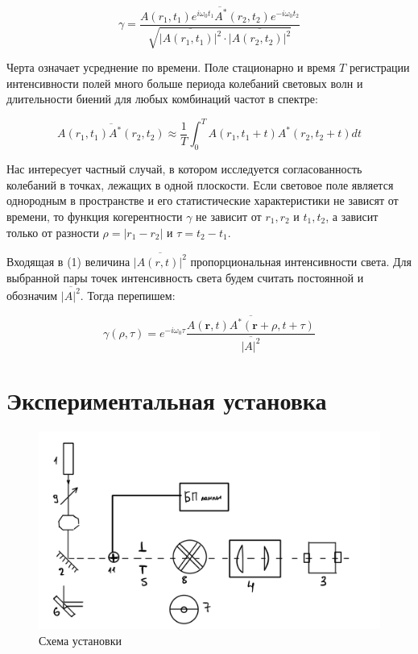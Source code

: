 \documentclass[a4paper, 12pt]{article}
\begin{document}
\begin{equation}
	\gamma=\frac{\overline{A\left(r_1, t_1\right) e^{i \omega_0 t_1} A^*\left(r_2, t_2\right) e^{-i \omega_0 t_2}}}{\sqrt{\overline{\left|A\left(r_1, t_1\right)\right|^2} \cdot \overline{\left|A\left(r_2, t_2\right)\right|^2}}}
\end{equation}

Черта означает усреднение по времени. Поле стационарно и время $T$ регистрации интенсивности полей много больше периода колебаний световых волн и длительности биений для любых
комбинаций частот в спектре:

\begin{equation}
	\overline{A\left(r_1, t_1\right) A^*\left(r_2, t_2\right)} \approx \frac{1}{T} \int_0^T A\left(r_1, t_1+t\right) A^*\left(r_2, t_2+t\right) d t
\end{equation}

Нас интересует частный случай, в котором исследуется согласованность колебаний в точках, лежащих в одной плоскости. Если световое поле является однородным в пространстве и его
статистические характеристики не зависят от времени, то функция когерентности $\gamma$ не зависит от $r_1, r_2$ и $t_1, t_2$, а зависит только от разности $\rho = |r_1 - r_2|$
и $\tau = t_2 - t_1$.

Входящая в (1) величина $\overline{|A(r,t)|^2}$ пропорциональная интенсивности света. Для выбранной пары точек интенсивность света будем считать постоянной и обозначим $\overline{|A|^2}$.
Тогда перепишем:

\begin{equation}
	\gamma(\rho, \tau)=e^{-i \omega_0 \tau} \frac{\overline{A(\boldsymbol{r}, t) A^*(\boldsymbol{r}+\rho, t+\tau)}}{\overline{|A|^2}}
\end{equation}

\section{Экспериментальная установка}

\begin{figure}[H]
    \centering
    \includegraphics[width=1\textwidth]{set}
    \caption{Схема установки}
    \label{fig:set}
\end{figure}

 
\end{document}

